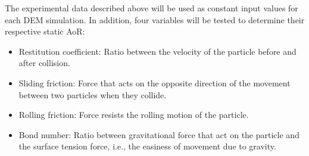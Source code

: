 The experimental data described above will be used as constant input values for each DEM simulation. In addition, four variables will be tested to determine their respective static AoR:\@
\begin{itemize}
    \item Restitution coefficient: Ratio between the velocity of the particle before and after collision.
    \item Sliding friction: Force that acts on the opposite direction of the movement between two particles when they collide. 
    \item Rolling friction: Force resists the rolling motion of the particle. 
    \item Bond number: Ratio between gravitational force that act on the particle and the surface tension force, i.e., the easiness of movement due to gravity. 
\end{itemize}





